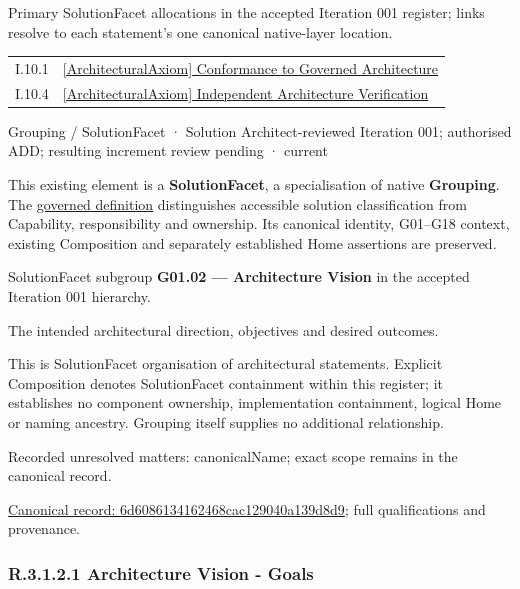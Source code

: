 Primary SolutionFacet allocations in the accepted Iteration 001 register; links resolve to each statement’s one canonical native-layer location.\par
\begin{longtable}{p{.22\linewidth}p{.73\linewidth}}
I.10.1 & \hyperref[element:45eb197073df406ea4080f9665ca12ab]{[ArchitecturalAxiom] Conformance to Governed Architecture} \\
I.10.4 & \hyperref[element:82d29abf230d478aaf42ecb73ecbd01e]{[ArchitecturalAxiom] Independent Architecture Verification} \\
\end{longtable}
\label{element:6d6086134162468cac129040a139d8d9}
{\small Grouping / SolutionFacet · Solution Architect-reviewed Iteration 001; authorised ADD; resulting increment review pending · current}\par

This existing element is a \textbf{SolutionFacet}, a specialisation of native
\textbf{Grouping}. The \href{\detokenize{../../../../../../../governance/continuum-representation.md#solutionfacet-classification--1119-candidate}}{governed definition}
distinguishes accessible solution classification from Capability, responsibility
and ownership. Its canonical identity, G01–G18 context, existing Composition
and separately established Home assertions are preserved.



SolutionFacet subgroup \textbf{G01.02 — Architecture Vision} in the accepted Iteration 001 hierarchy.



The intended architectural direction, objectives and desired outcomes.



This is SolutionFacet organisation of architectural statements. Explicit Composition denotes SolutionFacet containment within this register; it establishes no component ownership, implementation containment, logical Home or naming ancestry. Grouping itself supplies no additional relationship.


{\small Recorded unresolved matters: canonicalName; exact scope remains in the canonical record.}\par
{\footnotesize \href{../../../../../../../continuum/grouping/6d6086134162468cac129040a139d8d9.md}{Canonical record: 6d6086134162468cac129040a139d8d9}; full qualifications and provenance.}\par
\subsubsection*{R.3.1.2.1 Architecture Vision - Goals}
\label{navigation:R.3.1.2.1}

